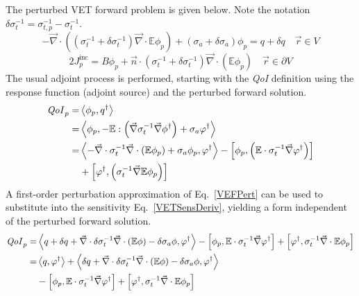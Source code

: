 \documentclass[12pt]{report}
\newcommand{\vr}{\vec{r}}
\newcommand{\bra}{\left\langle}
\newcommand{\ket}{\right\rangle}
\newcommand{\sbra}{\left[}
\newcommand{\sket}{\right]}
\renewcommand{\div}{\vec{\nabla} \cdot}
\newcommand{\grad}{\vec{\nabla}}
\newcommand{\vefadj}{\varphi^\dag}
\newcommand{\domain}{V}
\newcommand{\bound}{\partial V}
\newcommand{\vn}{\vec{n}}
\newcommand{\Edd}{\mathbb{E}}
\newcommand{\siga}{\sigma_a}
\newcommand{\isigt}{\sigma_t^{-1}}
\newcommand{\isigtp}{\sigma_{t,p}^{-1}}
\newcommand{\scalSource}{q}
\newcommand{\scalResp}{q^\dag}
\newcommand{\qoi}{{\it QoI}\xspace}
\begin{document}
The perturbed VET forward problem is given below. Note the notation $\delta \isigt = \isigtp - \isigt$.
\begin{subequations}
\begin{equation}
\label{VEFPert}
- \div \left((\isigt + \delta \isigt)\div \Edd \phi_p \right) + (\siga + \delta \siga)\phi_p = \scalSource + \delta \scalSource  \quad \vr \in \domain
\end{equation}
\end{subequations}
\begin{subequations}
\begin{equation}
 2J_p^\text{inc} = B \phi_p  + \vn \cdot  (\isigt + \delta \isigt) \vec{\nabla} \cdot \left(\Edd \phi_p \right)  \quad \vr \in \bound
\end{equation}
\end{subequations}
The usual adjoint process is performed, starting with the \qoi definition using the response function (adjoint source) and the perturbed forward solution. 
\begin{equation}
\label{VETSensDeriv}
\begin{split}
\qoi_p = &\bra \phi_p , \scalResp \ket \\
       = &\bra \phi_p , - \Edd : \left( \grad \isigt \grad \phi^\dag \right) + \siga \vefadj \ket \\
       = & \bra - \div \isigt \div \left( \Edd \phi_p \right) + \siga \phi_p, \vefadj \ket 
 - \sbra \phi_p , \left( \Edd \cdot \isigt \grad \vefadj\right) \sket  \\ 
&+ \sbra \vefadj , \left(  \isigt \grad \Edd \phi_p \right) \sket \\
\end{split}
\end{equation}
A first-order perturbation approximation of Eq.~\eqref{VEFPert} can be used to substitute into the sensitivity Eq.~\eqref{VETSensDeriv}, yielding a form independent of the perturbed forward solution.
\begin{equation}
\label{QoIVETAdjNoBC}
\begin{split}
\qoi_p =& \bra \scalSource + \delta \scalSource + \div \delta \isigt \div \left( \Edd \phi \right) - \delta \siga \phi, \vefadj \ket - \sbra \phi_p, \Edd \cdot \isigt \grad \vefadj \sket + \sbra \vefadj, \isigt \div \Edd \phi_p \sket \\
=& \bra q, \vefadj \ket  + \bra \delta \scalSource + \div \delta \isigt \div \left( \Edd \phi \right)  - \delta \siga \phi, \vefadj \ket \\
& - \sbra \phi_p, \Edd \cdot \isigt \grad \vefadj \sket + \sbra \vefadj, \isigt \div \Edd \phi_p \sket 
\end{split}
\end{equation}
\end{document}
